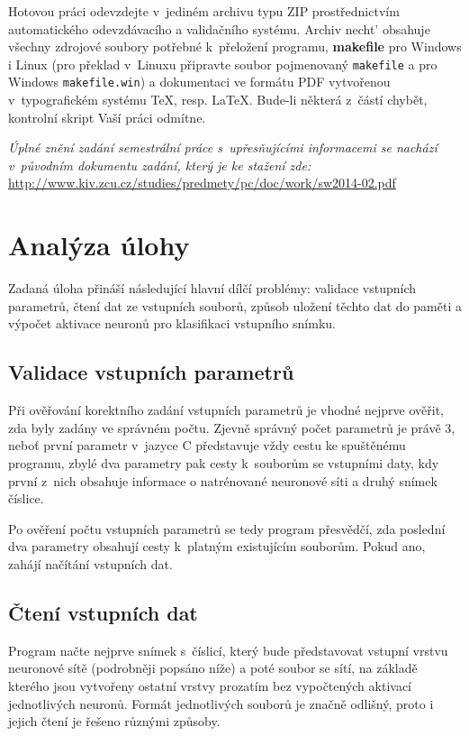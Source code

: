 \documentclass[12pt, a4paper, titlepage]{report}
\begin{document}
\par\noindent
Hotovou práci odevzdejte v~jediném archivu typu ZIP prostřednictvím automatického odevzdávacího a validačního systému. Archiv necht’ obsahuje všechny zdrojové soubory potřebné k~přeložení programu, \textbf{makefile} pro Windows i Linux (pro překlad v~Linuxu připravte soubor pojmenovaný \texttt{makefile} a pro Windows \texttt{makefile.win}) a dokumentaci ve formátu PDF vytvořenou v~typografickém systému \TeX, resp. \LaTeX. Bude-li některá z~částí chybět, kontrolní skript Vaší práci odmítne.\\
\par\noindent
\textsl{Úplné znění zadání semestrální práce s~upřesňujícími informacemi se nachází v~původním dokumentu zadání, který je ke stažení zde:\\}
\url{http://www.kiv.zcu.cz/studies/predmety/pc/doc/work/sw2014-02.pdf}

\newpage

\chapter{Analýza úlohy}
Zadaná úloha přináší následující hlavní dílčí problémy: validace vstupních parametrů, čtení dat ze vstupních souborů, způsob uložení těchto dat do paměti a výpočet aktivace neuronů pro klasifikaci vstupního snímku.
\section{Validace vstupních parametrů}
Při ověřování korektního zadání vstupních parametrů je vhodné nejprve ověřit, zda byly zadány ve správném počtu. Zjevně správný počet parametrů je právě 3, neboť první parametr v~jazyce C představuje vždy cestu ke spuštěnému programu, zbylé dva parametry pak cesty k~souborům se vstupními daty, kdy první z~nich obsahuje informace o natrénované neuronové síti a druhý snímek číslice. \par
Po ověření počtu vstupních parametrů se tedy program přesvědčí, zda poslední dva parametry obsahují cesty k~platným existujícím souborům. Pokud ano, zahájí načítání vstupních dat.
\section{Čtení vstupních dat}
Program načte nejprve snímek s~číslicí, který bude představovat vstupní vrstvu neuronové sítě (podrobněji popsáno níže) a poté soubor se sítí, na základě kterého jsou vytvořeny ostatní vrstvy prozatím bez vypočtených aktivací jednotlivých neuronů. Formát jednotlivých souborů je značně odlišný, proto i jejich čtení je řešeno různými způsoby.
\end{document}
